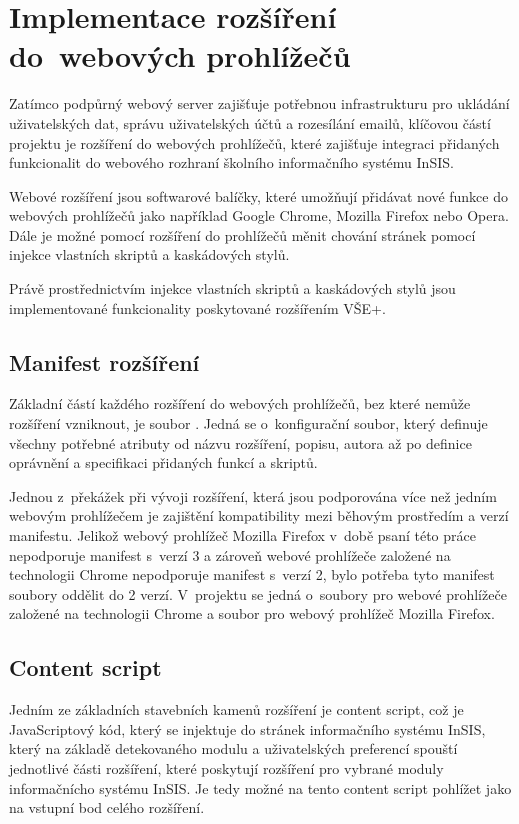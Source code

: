 \chapter{Implementace rozšíření do~webových prohlížečů}\label{chap:extension}

Zatímco podpůrný webový server zajišťuje potřebnou infrastrukturu pro ukládání uživatelských dat, správu uživatelských účtů a rozesílání emailů, klíčovou částí projektu je rozšíření do webových prohlížečů, které zajišťuje integraci přidaných funkcionalit do webového rozhraní školního informačního systému InSIS.

Webové rozšíření jsou softwarové balíčky, které umožňují přidávat nové funkce do webových prohlížečů jako například Google Chrome, Mozilla Firefox nebo Opera. Dále je možné pomocí rozšíření do prohlížečů měnit chování stránek pomocí injekce vlastních skriptů a kaskádových stylů.

Právě prostřednictvím injekce vlastních skriptů a kaskádových stylů jsou implementované funkcionality poskytované rozšířením VŠE+.

\section{Manifest rozšíření}

Základní částí každého rozšíření do webových prohlížečů, bez které nemůže rozšíření vzniknout, je soubor . Jedná se o~konfigurační soubor, který definuje všechny potřebné atributy od názvu rozšíření, popisu, autora až po definice oprávnění a specifikaci přidaných funkcí a skriptů. 

Jednou z~překážek při vývoji rozšíření, která jsou podporována více než jedním webovým prohlížečem je zajištění kompatibility mezi běhovým prostředím a verzí manifestu. Jelikož webový prohlížeč Mozilla Firefox v~době psaní této práce nepodporuje manifest s~verzí 3 a zároveň webové prohlížeče založené na technologii Chrome nepodporuje manifest s~verzí 2, bylo potřeba tyto manifest soubory oddělit do 2 verzí. V~projektu se jedná o~soubory  pro webové prohlížeče založené na technologii Chrome a soubor  pro webový prohlížeč Mozilla Firefox.

\section{Content script}

Jedním ze základních stavebních kamenů rozšíření je content script, což je JavaScriptový kód, který se injektuje do stránek informačního systému InSIS, který na základě detekovaného modulu a uživatelských preferencí spouští jednotlivé části rozšíření, které poskytují rozšíření pro vybrané moduly informačnícho systému InSIS. Je tedy možné na tento content script pohlížet jako na vstupní bod celého rozšíření.

